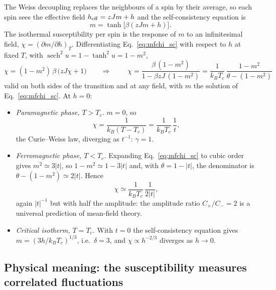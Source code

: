 \documentclass[10pt,a4paper]{article}
\theoremstyle{remark}
\begin{document}
The Weiss decoupling replaces the neighbours of a spin by their average, so
each spin sees the effective field $h_{\rm eff}=zJm+h$ and the self-consistency
equation is
\begin{equation}\label{eq:mfchi_sc}
  m=\tanh\big[\beta(zJm+h)\big] .
\end{equation}
The isothermal susceptibility per spin is the response of $m$ to an
infinitesimal field, $\chi=(\partial m/\partial h)_T$. Differentiating
Eq.~\eqref{eq:mfchi_sc} with respect to $h$ at fixed $T$, with
$\operatorname{sech}^{2}u=1-\tanh^{2}u=1-m^{2}$,
\[
  \chi=(1-m^{2})\,\beta\,\big(zJ\chi+1\big)
  \qquad\Longrightarrow\qquad
  \;\chi=\frac{\beta\,(1-m^{2})}{1-\beta zJ\,(1-m^{2})}
  =\frac{1}{k_BT_c}\,\frac{1-m^{2}}{\theta-(1-m^{2})}\
\]
valid on both sides of the transition and at any field, with $m$ the solution
of Eq.~\eqref{eq:mfchi_sc}. At $h=0$:
\begin{itemize}
\item \emph{Paramagnetic phase, $T>T_c$.} $m=0$, so
\[
  \chi=\frac{1}{k_B(T-T_c)}=\frac{1}{k_BT_c}\,\frac{1}{t} ,
\]
the Curie--Weiss law, diverging as $t^{-1}$: $\gamma=1$.
\item \emph{Ferromagnetic phase, $T<T_c$.} Expanding Eq.~\eqref{eq:mfchi_sc}
to cubic order gives $m^{2}\simeq3|t|$, so $1-m^{2}\simeq1-3|t|$ and, with
$\theta=1-|t|$, the denominator is $\theta-(1-m^{2})\simeq2|t|$. Hence
\[
  \chi\simeq\frac{1}{k_BT_c}\,\frac{1}{2|t|} ,
\]
again $|t|^{-1}$ but with half the amplitude: the amplitude ratio
$C_+/C_-=2$ is a universal prediction of mean-field theory.
\item \emph{Critical isotherm, $T=T_c$.} With $t=0$ the self-consistency
equation gives $m=(3h/k_BT_c)^{1/3}$, i.e.\ $\delta=3$, and
$\chi\propto h^{-2/3}$ diverges as $h\to0$.
\end{itemize}

\subsection{Physical meaning: the susceptibility measures correlated fluctuations}
\label{sec:mfchi:meaning}
\end{document}
